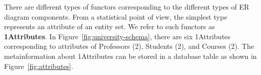 \documentclass{acm_proc_article-sp}
\begin{document}
\begin{table}[btp] \centering
{}
\caption{Translation from ER Diagram to Relational Random Variable. %
 \label{table:translation}}
\end{table}



There are different types of functors corresponding to the different types of ER diagram components. From a statistical point of view, the simplest type represents an attribute of an entity set. We refer to such functors as \textbf{1Attributes}. In Figure~\ref{fig:university-schema}, there are six 1Attributes corresponding to attributes of Professors (2), Students (2), and Courses (2). 
The metainformation about 1Attributes can be stored in a database table as shown in Figure~\ref{fig:attributes}. 
\end{document}
